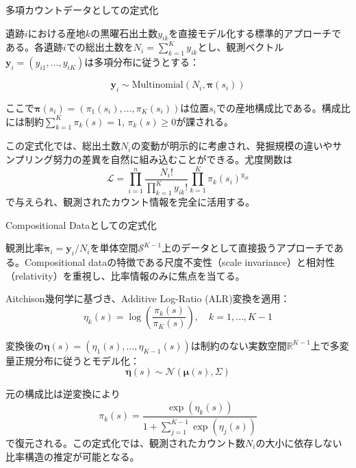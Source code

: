 \begin{frame}{多項カウントデータとしての定式化}

遺跡$i$における産地$k$の黒曜石出土数$y_{ik}$を直接モデル化する標準的アプローチである。各遺跡$i$での総出土数を$N_i = \sum_{k=1}^K y_{ik}$とし、観測ベクトル$\mathbf{y}_i = (y_{i1}, \ldots, y_{iK})$は多項分布に従うとする：

$$\mathbf{y}_i \sim \text{Multinomial}(N_i, \boldsymbol{\pi}(s_i))$$

ここで$\boldsymbol{\pi}(s_i) = (\pi_1(s_i), \ldots, \pi_K(s_i))$は位置$s_i$での産地構成比である。構成比には制約$\sum_{k=1}^K \pi_k(s) = 1$, $\pi_k(s) \geq 0$が課される。

この定式化では、総出土数$N_i$の変動が明示的に考慮され、発掘規模の違いやサンプリング努力の差異を自然に組み込むことができる。尤度関数は
$$\mathcal{L} = \prod_{i=1}^n \frac{N_i!}{\prod_{k=1}^K y_{ik}!} \prod_{k=1}^K \pi_k(s_i)^{y_{ik}}$$
で与えられ、観測されたカウント情報を完全に活用する。

\end{frame}

\begin{frame}{Compositional Dataとしての定式化}

観測比率$\tilde{\boldsymbol{\pi}}_i = \mathbf{y}_i/N_i$を単体空間$\mathcal{S}^{K-1}$上のデータとして直接扱うアプローチである。Compositional dataの特徴である尺度不変性（scale invariance）と相対性（relativity）を重視し、比率情報のみに焦点を当てる。

Aitchison幾何学に基づき、Additive Log-Ratio (ALR)変換を適用：
$$\eta_k(s) = \log\left(\frac{\pi_k(s)}{\pi_K(s)}\right), \quad k = 1, \ldots, K-1$$

変換後の$\boldsymbol{\eta}(s) = (\eta_1(s), \ldots, \eta_{K-1}(s))$は制約のない実数空間$\mathbb{R}^{K-1}$上で多変量正規分布に従うとモデル化：
$$\boldsymbol{\eta}(s) \sim \mathcal{N}(\boldsymbol{\mu}(s), \Sigma)$$

元の構成比は逆変換により
$$\pi_k(s) = \frac{\exp(\eta_k(s))}{1 + \sum_{j=1}^{K-1} \exp(\eta_j(s))}$$
で復元される。この定式化では、観測されたカウント数$N_i$の大小に依存しない比率構造の推定が可能となる。

\end{frame}
